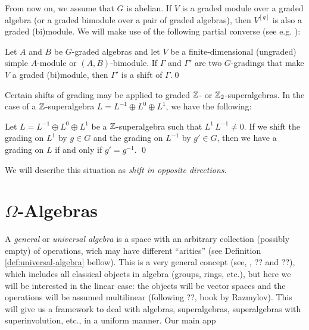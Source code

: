 From now on, we assume that $G$ is abelian.
If $V$ is a graded module over a graded algebra (or a graded bimodule over a pair of graded algebras), then $V^{[g]}$ is also a graded (bi)module. 
We will make use of the following partial converse (see e.g. \cite[Proposition 3.5]{paper-Qn}):

\begin{lemma}\label{lemma:simplebimodule}
	Let $A$ and $B$ be $G$-graded algebras and let $V$ be a finite-dimensional (ungraded) simple $A$-module or $(A,B)$-bimodule.  If $\Gamma$ and $\Gamma'$ are  two $G$-gradings that make $V$ a graded (bi)module, then $\Gamma'$ is a  shift of $\Gamma$.\qed
\end{lemma}

Certain shifts of grading may be applied to graded $\mathbb{Z}$- or $\mathbb{Z}_2$-superalgebras. In the case of a $\mathbb{Z}$-superalgebra $L=L^{-1}\oplus L^{0}\oplus L^{1}$, we have the following:

\begin{lemma}\label{lemma:opposite-directions}
	Let $L=L^{-1}\oplus L^0\oplus L^1$ be a $\mathbb{Z}$-superalgebra such that $L^1\, L^{-1}\neq 0$. If we shift the grading on $L^1$ by $g\in G$ and the grading on $L^{-1}$ by $g' \in G$, then we have a grading on $L$ if and only if $g' = g^{-1}$. \qed
\end{lemma}

We will describe this situation as \emph{shift in opposite directions}.

\section{$\Omega$-Algebras}

A \emph{general} or \emph{universal algebra} is a space with an arbitrary collection (possibly empty) of operations, wich may have different ``arities'' (see Definition \ref{def:universal-algebra} bellow). 
This is a very general concept (see, \eg, ?? and ??), which includes all classical objects in algebra (groups, rings, etc.), but here we will be interested in the linear case: the objects will be vector spaces and the operations will be assumed multilinear (following ??, book by Razmylov).
This will give us a framework to deal with algebras, superalgebras, superalgebras with superinvolution, etc., in a uniform manner.
Our main app

